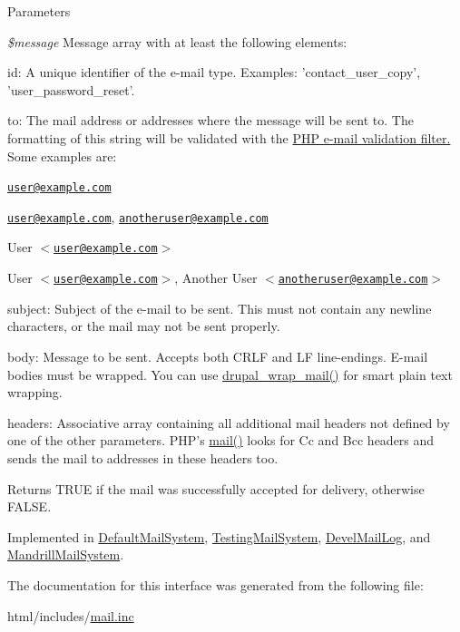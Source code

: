 \begin{DoxyParams}{Parameters}
\item[{\em \$message}]Message array with at least the following elements:
\begin{DoxyItemize}
\item id: A unique identifier of the e-\/mail type. Examples: 'contact\_\-user\_\-copy', 'user\_\-password\_\-reset'.
\item to: The mail address or addresses where the message will be sent to. The formatting of this string will be validated with the \hyperlink{}{PHP e-\/mail validation filter. } Some examples are:
\begin{DoxyItemize}
\item \href{mailto:user@example.com}{\tt user@example.com}
\item \href{mailto:user@example.com}{\tt user@example.com}, \href{mailto:anotheruser@example.com}{\tt anotheruser@example.com}
\item User $<$\href{mailto:user@example.com}{\tt user@example.com}$>$
\item User $<$\href{mailto:user@example.com}{\tt user@example.com}$>$, Another User $<$\href{mailto:anotheruser@example.com}{\tt anotheruser@example.com}$>$
\end{DoxyItemize}
\item subject: Subject of the e-\/mail to be sent. This must not contain any newline characters, or the mail may not be sent properly.
\item body: Message to be sent. Accepts both CRLF and LF line-\/endings. E-\/mail bodies must be wrapped. You can use \hyperlink{mail_8inc_a955ffecc70c15ab89079ea29557f7b41}{drupal\_\-wrap\_\-mail()} for smart plain text wrapping.
\item headers: Associative array containing all additional mail headers not defined by one of the other parameters. PHP's \hyperlink{interfaceMailSystemInterface_a8dd560f7879b93d1fd3497b27a3b08f7}{mail()} looks for Cc and Bcc headers and sends the mail to addresses in these headers too.
\end{DoxyItemize}\end{DoxyParams}
\begin{DoxyReturn}{Returns}
TRUE if the mail was successfully accepted for delivery, otherwise FALSE. 
\end{DoxyReturn}


Implemented in \hyperlink{classDefaultMailSystem_a77a30a4f7b330e8fc811d8030004bb29}{DefaultMailSystem}, \hyperlink{classTestingMailSystem_ae49025dfeb69acaff2df6035a25defbf}{TestingMailSystem}, \hyperlink{classDevelMailLog_a1179208e4b2b37addefcc9f8ed9be0b0}{DevelMailLog}, and \hyperlink{classMandrillMailSystem_a2d56986dfa5ce08e134344078710cf23}{MandrillMailSystem}.

The documentation for this interface was generated from the following file:\begin{DoxyCompactItemize}
\item 
html/includes/\hyperlink{mail_8inc}{mail.inc}\end{DoxyCompactItemize}
